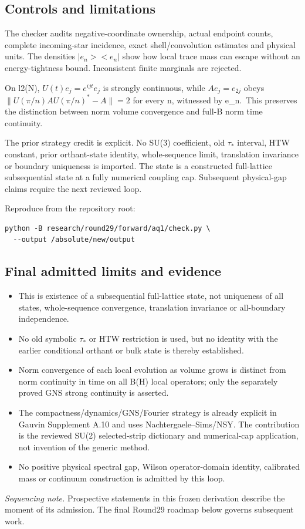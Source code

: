 \hypertarget{r29-aq1-controls-and-limitations}{%
\subsection{Controls and limitations}\label{r29:aq1:r29-aq1-controls-and-limitations}}

The checker audits negative-coordinate ownership, actual endpoint counts, complete incoming-star incidence, exact shell/convolution estimates and physical units. The densities \(|e_n><e_n|\) show how local trace mass can escape without an energy-tightness bound. Inconsistent finite marginals are rejected.

On l2(N), \(U(t)e_j=e^{ijt}e_j\) is strongly continuous, while \(A e_j=e_{2j}\) obeys \(\|U(\pi/n)AU(\pi/n)^*-A\|=2\) for every n, witnessed by e\_n.~This preserves the distinction between norm volume convergence and full-B norm time continuity.

The prior strategy credit is explicit. No SU(3) coefficient, old \(\tau_*\) interval, HTW constant, prior orthant-state identity, whole-sequence limit, translation invariance or boundary uniqueness is imported. The state is a constructed full-lattice subsequential state at a fully numerical coupling cap. Subsequent physical-gap claims require the next reviewed loop.

Reproduce from the repository root:
\begin{verbatim}
python -B research/round29/forward/aq1/check.py \
  --output /absolute/new/output
\end{verbatim}

\subsection*{Final admitted limits and evidence}
\begin{itemize}
\item This is existence of a subsequential full-lattice state, not uniqueness of all states, whole-sequence convergence, translation invariance or all-boundary independence.
\item No old symbolic \(\tau_*\) or HTW restriction is used, but no identity with the earlier conditional orthant or bulk state is thereby established.
\item Norm convergence of each local evolution as volume grows is distinct from norm continuity in time on all B(H) local operators; only the separately proved GNS strong continuity is asserted.
\item The compactness/dynamics/GNS/Fourier strategy is already explicit in Gauvin Supplement A.10 and uses Nachtergaele--Sims/NSY. The contribution is the reviewed SU(2) selected-strip dictionary and numerical-cap application, not invention of the generic method.
\item No positive physical spectral gap, Wilson operator-domain identity, calibrated mass or continuum construction is admitted by this loop.
\end{itemize}
\par{}\par{}

\emph{Sequencing note.} Prospective statements in this frozen derivation describe the moment of its admission. The final Round29 roadmap below governs subsequent work.

